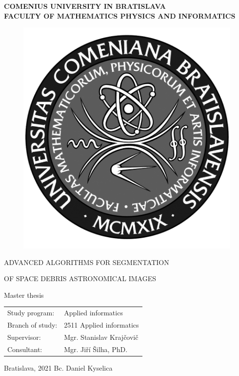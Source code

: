 \thispagestyle{empty}

\noindent
\begin{minipage}{\textwidth}
\begin{center}
\textbf{COMENIUS UNIVERSITY IN BRATISLAVA \\ FACULTY OF MATHEMATICS PHYSICS AND INFORMATICS}
\end{center}
\end{minipage}

\vfill
\begin{figure}[!hbt]
\begin{center}
\includegraphics{front_pages/images/logo_fmph_dark}
\label{img:logo_dark}
\end{center}
\end{figure}
\begin{center}
\begin{minipage}{0.8\textwidth}
		\centerline{\Large\MakeUppercase{Advanced algorithms for segmentation}}
		\centerline{\Large\MakeUppercase{of space debris astronomical images}}
\smallskip
\centerline{Master thesis}
\end{minipage}
\end{center}
\vfill
\begin{tabular}{l l}
Study program: & Applied informatics\\
Branch of study: & 2511 Applied informatics\\
Supervisor: & Mgr. Stanislav Krajčovič\\
Consultant: & Mgr. Jiří Šilha, PhD.\\
\end{tabular}
\vfill
\noindent
Bratislava, 2021 \hfill
Bc. Daniel Kyselica
\eject 